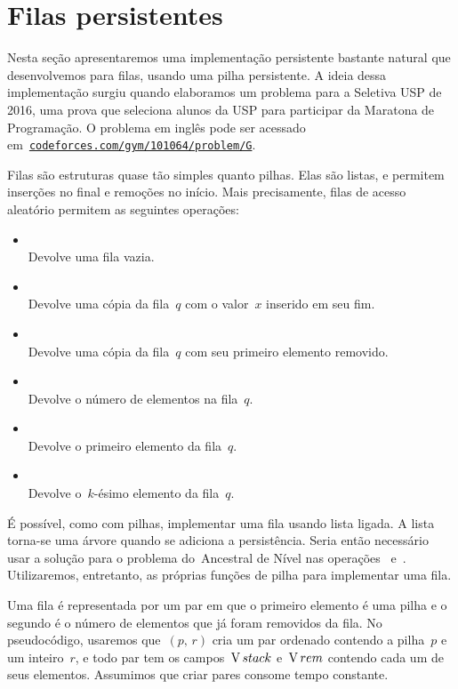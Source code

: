 \documentclass[main.tex]{subfiles}
\begin{document}
\section{Filas persistentes}

Nesta seção apresentaremos uma implementação persistente bastante natural que desenvolvemos para filas, usando uma pilha persistente. A ideia dessa implementação surgiu quando elaboramos um problema para a Seletiva USP de 2016, uma prova que seleciona alunos da USP para participar da Maratona de Programação. O problema em inglês pode ser acessado em~\href{http://codeforces.com/gym/101064/problem/G}{\texttt{codeforces.com/gym/101064/problem/G}}.

Filas são estruturas quase tão simples quanto pilhas. Elas são listas, e permitem inserções no final e remoções no início. Mais precisamente, filas de acesso aleatório permitem as seguintes operações:

\begin{itemize}
	\item {}
		\\ Devolve uma fila vazia.
	\item {}
		\\ Devolve uma cópia da fila~$q$ com o valor~$x$ inserido em seu fim.
	\item {}
		\\ Devolve uma cópia da fila~$q$ com seu primeiro elemento removido.
	\item {}
		\\ Devolve o número de elementos na fila~$q$.
	\item {}
		\\ Devolve o primeiro elemento da fila~$q$.
	\item {}
		\\ Devolve o~\mbox{$k$-ésimo} elemento da fila~$q$.
\end{itemize}

É possível, como com pilhas, implementar uma fila usando lista ligada. A lista torna-se uma árvore quando se adiciona a persistência. Seria então necessário usar a solução para o problema do~Ancestral de Nível nas operações~ e~.
Utilizaremos, entretanto, as próprias funções de pilha para implementar uma fila.

Uma fila é representada por um par em que o primeiro elemento é uma pilha e o segundo é o número de elementos que já foram removidos da fila. No pseudocódigo, usaremos que~$(p,\,r)$ cria um par ordenado contendo a pilha~$p$ e um inteiro~$r$, e todo par tem os campos~$\operatorname{V}{stack}$ e~$\operatorname{V}{rem}$ contendo cada um de seus elementos.
Assumimos que criar pares consome tempo constante.
\end{document}
